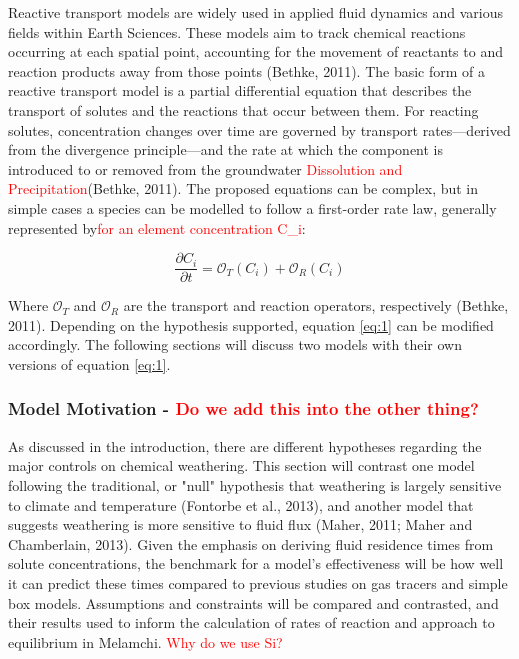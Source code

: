 Reactive transport models are widely used in applied fluid dynamics and various fields within Earth Sciences. These models aim to track chemical reactions occurring at each spatial point, accounting for the movement of reactants to and reaction products away from those points (Bethke, 2011). The basic form of a reactive transport model is a partial differential equation that describes the transport of solutes and the reactions that occur between them. For reacting solutes, concentration changes over time are governed by transport rates—derived from the divergence principle—and the rate at which the component is introduced to or removed from the groundwater \textcolor{red}{Dissolution and Precipitation}(Bethke, 2011). The proposed equations can be complex, but in simple cases a species can be modelled to follow a first-order rate law, generally represented by\textcolor{red}{for an element concentration C\_i}:

\begin{equation}
    \frac{\partial C_i}{\partial t} = \mathcal{O}_{T}(C_i) + \mathcal{O}_{R}(C_i)
    \label{eq:1}
\end{equation}


Where \(\mathcal{O}_{T}\) and \(\mathcal{O}_{R}\) are the transport and reaction operators, respectively (Bethke, 2011). Depending on the hypothesis supported, equation \ref{eq:1} can be modified accordingly. The following sections will discuss two models with their own versions of equation \ref{eq:1}.





\subsubsection{Model Motivation - \textcolor{red}{Do we add this into the other thing?}}

As discussed in the introduction, there are different hypotheses regarding the major controls on chemical weathering. This section will contrast one model following the traditional, or "null" hypothesis that weathering is largely sensitive to climate and temperature (Fontorbe et al., 2013), and another model that suggests weathering is more sensitive to fluid flux (Maher, 2011; Maher and Chamberlain, 2013). Given the emphasis on deriving fluid residence times from solute concentrations, the benchmark for a model's effectiveness will be how well it can predict these times compared to previous studies on gas tracers and simple box models. Assumptions and constraints will be compared and contrasted, and their results used to inform the calculation of rates of reaction and approach to equilibrium in Melamchi. \textcolor{red}{Why do we use Si?}



